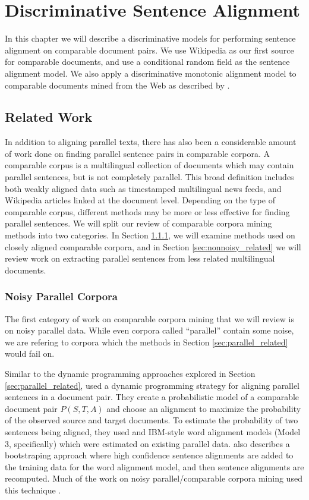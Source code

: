 \chapter{Discriminative Sentence Alignment}
\label{chap:supervised}

In this chapter we will describe a discriminative models for performing sentence
alignment on comparable document pairs. We use Wikipedia as our first source for
comparable documents, and use a conditional random field \citep{Lafferty01} as
the sentence alignment model. We also apply a discriminative monotonic alignment model to
comparable documents mined from the Web as described by \citet{Uszkoreit10}.

\section{Related Work}
\label{sec:comparable_related}

In addition to aligning parallel texts, there has also been a considerable
amount of work done on finding parallel sentence pairs in comparable corpora. A
comparable corpus is a multilingual collection of documents which may contain
parallel sentences, but is not completely parallel. 
This broad definition
includes both weakly aligned data such as timestamped multilingual news feeds,
and Wikipedia articles linked at the document level. Depending on the type of
comparable corpus, different methods may be more or less effective for finding
parallel sentences. We will split our review of comparable corpora mining
methods into two categories. In Section \ref{sec:noisy_related}, we will examine
methods used on closely aligned comparable corpora, and in Section
\ref{sec:nonnoisy_related} we will review work on extracting parallel sentences
from less related multilingual documents.

\subsection{Noisy Parallel Corpora}
\label{sec:noisy_related}
The first category of work on comparable corpora mining that we will review is
on noisy parallel data. While even corpora called ``parallel'' contain some
noise, we are refering to corpora which the methods in Section
\ref{sec:parallel_related} would fail on.

Similar to the dynamic programming approaches explored in Section
\ref{sec:parallel_related}, \citet{Zhao02} used a dynamic programming strategy
for aligning parallel sentences in a document pair. They create a probabilistic
model of a comparable document pair $P(S,T,A)$ and choose an alignment to
maximize the probability of the observed source and target documents. To
estimate the probability of two sentences being aligned, they used and IBM-style 
word alignment models (Model 3, specifically) which were estimated on existing
parallel data. \citet{Zhao02} also describes a bootstraping approach where high
confidence sentence alignments are added to the training data for the word
alignment model, and then sentence alignments are recomputed. Much of the work
on noisy parallel/comparable corpora mining used this technique 
\citep{Fung04a,Fung04b,Wu05,Munteanu05}.

